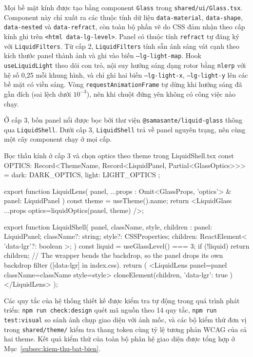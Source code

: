 \begin{sloppypar}
Mọi bề mặt kính được tạo bằng component \texttt{Glass} trong \texttt{shared/\allowbreak{}ui/\allowbreak{}Glass.tsx}. Component này chỉ xuất ra các thuộc tính dữ liệu \texttt{data-material}, \texttt{data-shape}, \texttt{data-nested} và \texttt{data-refract}, còn toàn bộ phần vẽ do CSS đảm nhận theo cấp kính ghi trên \texttt{<html data-lg-level>}. Panel có thuộc tính \texttt{refract} tự đăng ký với \texttt{LiquidFilters}. Từ cấp 2, \texttt{LiquidFilters} tính sẵn ánh sáng vát cạnh theo kích thước panel thành ảnh và ghi vào biến \texttt{--lg-light-map}. Hook \texttt{useLiquidLight} theo dõi con trỏ, nội suy hướng sáng dạng rotor bằng \texttt{nlerp} với hệ số 0,25 mỗi khung hình, và chỉ ghi hai biến \texttt{--lg-light-x}, \texttt{--lg-light-y} lên các bề mặt có viền sáng. Vòng \texttt{requestAnimationFrame} tự dừng khi hướng sáng đã gần đích (sai lệch dưới $10^{-3}$), nên khi chuột đứng yên không có công việc nào chạy.
\end{sloppypar}

Ở cấp 3, bốn panel nổi được bọc bởi thư viện \texttt{@samasante/\allowbreak{}liquid-glass} thông qua \texttt{LiquidShell}. Dưới cấp 3, \texttt{LiquidShell} trả về panel nguyên trạng, nên cùng một cây component chạy ở mọi cấp.

\begin{tsbox}{Bọc thấu kính ở cấp 3 và chọn optics theo theme trong LiquidShell.tsx}
const OPTICS: Record<ThemeName, Record<LiquidPanel, Partial<GlassOptics>>> = { dark: DARK_OPTICS, light: LIGHT_OPTICS };

export function LiquidLens({ panel, ...props }: Omit<GlassProps, 'optics'> & { panel: LiquidPanel }) {
  const theme = useTheme().name;
  return <LiquidGlass {...props} optics={liquidOptics(panel, theme)} />;
}

export function LiquidShell({ panel, className, style, children }: {
  panel: LiquidPanel;
  className?: string;
  style?: CSSProperties;
  children: ReactElement<{ 'data-lgr'?: boolean }>;
}) {
  const liquid = useGlassLevel() === 3;
  if (!liquid) return children;
  // The wrapper bends the backdrop, so the panel drops its own backdrop filter ([data-lgr] in index.css).
  return (
    <LiquidLens panel={panel} className={className} style={style}>
      {cloneElement(children, { 'data-lgr': true })}
    </LiquidLens>
  );
}
\end{tsbox}

Các quy tắc của hệ thống thiết kế được kiểm tra tự động trong quá trình phát triển: \texttt{npm run check:design} quét mã nguồn theo 14 quy tắc, \texttt{npm run test:visual} so sánh ảnh chụp giao diện với ảnh mốc, và các bộ kiểm thử đơn vị trong \texttt{shared/\allowbreak{}theme/} kiểm tra thang token cùng tỷ lệ tương phản WCAG của cả hai theme. Kết quả kiểm thử của toàn bộ phân hệ giao diện được tổng hợp ở Mục~\ref{subsec:kiem-thu-bat-bien}.

